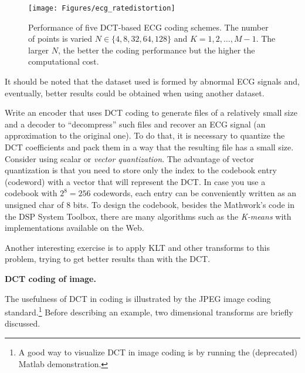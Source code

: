 \begin{figure}[!htb]
        \centering
                \texttt{[image: Figures/ecg\_ratedistortion]}          
        \caption[{Performance of five DCT-based ECG coding schemes. The number of points is varied $N \in \{4,8,32,64,128\}$ and $K=1,2,\ldots,M-1$.}]{Performance of five DCT-based ECG coding schemes. The number of points is varied $N \in \{4,8,32,64,128\}$ and $K=1,2,\ldots,M-1$. The larger $N$, the better the coding performance but the higher the computational cost.\label{fig:ecg_ratedistortion}}
\end{figure}

It should be noted that the dataset used is formed by abnormal ECG signals and, eventually, better results could be obtained when using another dataset.

Write an encoder that uses DCT coding to generate files of a relatively small size and a decoder to ``decompress'' such files and recover an ECG signal (an approximation to the original one). To do that, it is necessary to quantize the DCT coefficients and pack them in a way that the resulting file has a small size. Consider using scalar or \emph{vector quantization}. The advantage of vector quantization is that you need to store only the index to the codebook entry (codeword) with a vector that will represent the DCT. In case you use a codebook with $2^8=256$ codewords, each entry can be conveniently written as an unsigned char of 8 bits. To design the codebook, besides the Mathwork's code in the DSP System Toolbox, there are many algorithms such as the \emph{K-means} with implementations available on the Web.

Another interesting exercise is to apply KLT and other transforms to this problem, trying to get better results than with the DCT.
\eApplication

\bApplication \textbf{DCT coding of image.}
\label{app:dctcoding}

The usefulness of DCT in coding is illustrated by the JPEG image coding standard.\footnote{A good way to visualize DCT in image coding is by running the (deprecated)  Matlab demonstration.}
Before describing an example, two dimensional transforms are briefly discussed.

